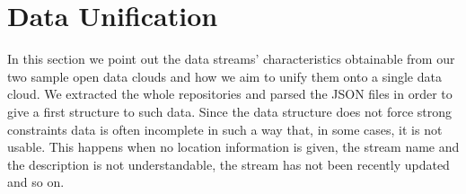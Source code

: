 \section{Data Unification}
\label{sec:unification}
In this section we point out the data streams' characteristics obtainable from our two sample open data clouds and how we aim to unify them onto a single data cloud.
We extracted the whole repositories and parsed the JSON files in order to give a first structure to such data.
Since the data structure does not force strong constraints data is often incomplete in such a way that, in some cases, it is not usable.
This happens when no location information is given, the stream name and the description is not understandable, the stream has not been recently updated and so on.
\\

